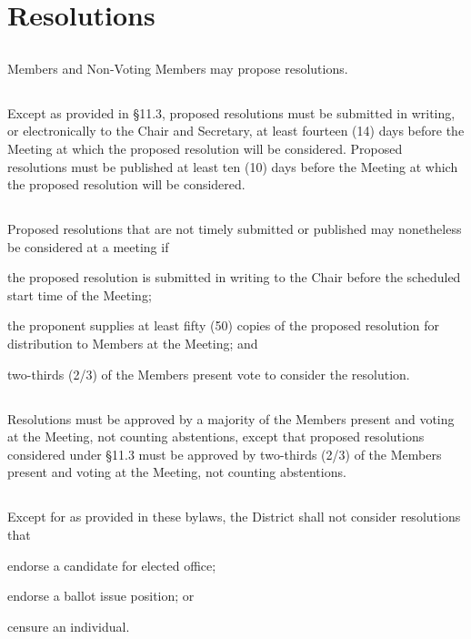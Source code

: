 \documentclass{article}
\newcommand{\fortythird}{\nth{43}}
\newcommand{\district}{\fortythird{} District}
\newcommand{\thedistrict}{the \district{}}
\begin{document}
\section{Resolutions}
\subsection{}
Members and Non-Voting Members may propose resolutions.

\subsection{}
Except as provided in §11.3, proposed resolutions must be submitted in writing, or electronically to the Chair and Secretary, at least fourteen (14) days before the Meeting at which the proposed resolution will be considered. Proposed resolutions must be published at least ten (10) days before the Meeting at which the proposed resolution will be considered.

\subsection{}
Proposed resolutions that are not timely submitted or published may nonetheless be considered at a meeting if
\begin{inlinealphalist}
    \item the proposed resolution is submitted in writing to the Chair before the scheduled start time of the Meeting;
    \item the proponent supplies at least fifty (50) copies of the proposed resolution for distribution to Members at the Meeting; and
    \item two-thirds (2/3) of the Members present vote to consider the resolution.
\end{inlinealphalist}

\subsection{}
Resolutions must be approved by a majority of the Members present and voting at the Meeting, not counting abstentions, except that proposed resolutions considered under §11.3 must be approved by two-thirds (2/3) of the Members present and voting at the Meeting, not counting abstentions.

\subsection{}
Except for as provided in these bylaws, \thedistrict{} shall not consider resolutions that
\begin{inlinealphalist}
    \item endorse a candidate for elected office;
    \item endorse a ballot issue position; or
    \item censure an individual.
\end{inlinealphalist}
\end{document}
